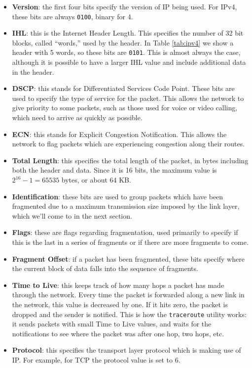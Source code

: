 \begin{itemize}
    \item \textbf{Version}: the first four bits specify the version of IP being used. For IPv4, these bits are always \texttt{0100}, binary for 4.
    \item \textbf{IHL}: this is the Internet Header Length. This specifies the number of 32 bit blocks, called ``words,'' used by the header. In Table \ref{tab:ipv4} we show a header with 5 words, so these bits are \texttt{0101}. This is almost always the case, although it is possible to have a larger IHL value and include additional data in the header.
    \item \textbf{DSCP}: this stands for Differentiated Services Code Point. These bits are used to specify the type of service for the packet. This allows the network to give priority to some packets, such as those used for voice or video calling, which need to arrive as quickly as possible.
    \item \textbf{ECN}: this stands for Explicit Congestion Notification. This allows the network to flag packets which are experiencing congestion along their routes.
    \item \textbf{Total Length}: this specifies the total length of the packet, in bytes including both the header and data. Since it is 16 bits, the maximum value is $2^{16}-1 = 65535$ bytes, or about 64 KB.
    \item \textbf{Identification}: these bits are used to group packets which have been fragmented due to a maximum transmission size imposed by the link layer, which we'll come to in the next section.
    \item \textbf{Flags}: these are flags regarding fragmentation, used primarily to specify if this is the last in a series of fragments or if there are more fragments to come.
    \item \textbf{Fragment Offset}: if a packet has been fragmented, these bits specify where the current block of data falls into the sequence of fragments.
    \item \textbf{Time to Live}: this keeps track of how many hops a packet has made through the network. Every time the packet is forwarded along a new link in the network, this value is decreased by one. If it hits zero, the packet is dropped and the sender is notified. This is how the \texttt{traceroute} utility works: it sends packets with small Time to Live values, and waits for the notifications to see where the packet was after one hop, two hops, etc.
    \item \textbf{Protocol}: this specifies the transport layer protocol which is making use of IP. For example, for TCP the protocol value is set to 6.

\end{itemize}
